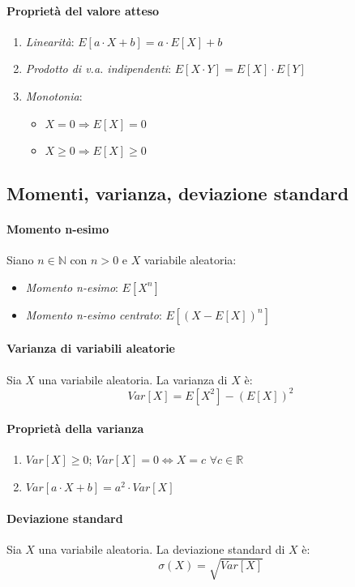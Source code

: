 \documentclass[12pt, a4paper]{report}
\theoremstyle{definition}
\begin{document}
\paragraph{Proprietà del valore atteso}
\begin{enumerate}[label=(\roman*)]
    \item \emph{Linearità}: $E[a\cdot X+b]=a\cdot E[X]+b$
    \item \emph{Prodotto di v.a. indipendenti}: $E[X\cdot Y]=E[X]\cdot E[Y]$
    \item \emph{Monotonia}:
    \begin{itemize}
        \item $X=0\Rightarrow E[X]=0$
        \item $X\geq0\Rightarrow E[X]\geq0$
    \end{itemize}
\end{enumerate}

\subsection{Momenti, varianza, deviazione standard}
\paragraph{Momento n-esimo}
Siano $n\in\mathbb{N}$ con $n>0$ e $X$ variabile aleatoria:
\begin{itemize}
    \item \emph{Momento n-esimo}: $E[X^n]$
    \item \emph{Momento n-esimo centrato}: $E[(X-E[X])^n]$
\end{itemize}

\paragraph{Varianza di variabili aleatorie}
Sia $X$ una variabile aleatoria. La varianza di $X$ è:
\[Var[X]=E[X^2]-(E[X])^2\]
\paragraph{Proprietà della varianza}
\begin{enumerate}[label=(\roman*)]
    \item $Var[X]\geq0$; $Var[X]=0\Leftrightarrow X=c$ $\forall c\in\mathbb{R}$
    \item $Var[a\cdot X+b]=a^2\cdot Var[X]$
\end{enumerate}
\paragraph{Deviazione standard}
Sia $X$ una variabile aleatoria. La deviazione standard di $X$ è:
\[\sigma(X)=\sqrt{Var[X]}\]
\end{document}

